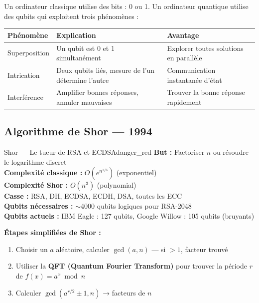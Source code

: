 \documentclass[12pt, a4paper]{article}
\begin{document}
Un ordinateur classique utilise des bits : 0 ou 1.
Un ordinateur quantique utilise des qubits qui exploitent trois phénomènes :

\begin{center}
\renewcommand{\arraystretch}{1.4}
\begin{tabular}{lll}
  \toprule
  \textbf{Phénomène} & \textbf{Explication} & \textbf{Avantage} \\
  \midrule
  Superposition & Un qubit est 0 et 1 simultanément & Explorer toutes solutions en parallèle \\
  Intrication & Deux qubits liés, mesure de l'un détermine l'autre & Communication instantanée d'état \\
  Interférence & Amplifier bonnes réponses, annuler mauvaises & Trouver la bonne réponse rapidement \\
  \bottomrule
\end{tabular}
\end{center}

\subsection{Algorithme de Shor --- 1994}

\begin{algobox}{Shor --- Le tueur de RSA et ECDSA}{danger_red}
\textbf{But :} Factoriser $n$ ou résoudre le logarithme discret\\
\textbf{Complexité classique :} $O(e^{n^{1/3}})$ (exponentiel)\\
\textbf{Complexité Shor :} $O(n^3)$ (polynomial) \\
\textbf{Casse :} RSA, DH, ECDSA, ECDH, DSA, toutes les ECC\\
\textbf{Qubits nécessaires :} $\sim$4000 qubits logiques pour RSA-2048\\
\textbf{Qubits actuels :} IBM Eagle : 127 qubits, Google Willow : 105 qubits (bruyants)
\end{algobox}

\textbf{Étapes simplifiées de Shor :}
\begin{enumerate}
  \item Choisir un $a$ aléatoire, calculer $\gcd(a, n)$ --- si $> 1$, facteur trouvé
  \item Utiliser la \textbf{QFT (Quantum Fourier Transform)} pour trouver la période $r$ de $f(x) = a^x \bmod n$
  \item Calculer $\gcd(a^{r/2} \pm 1, n)$ → facteurs de $n$
\end{enumerate}
\end{document}
